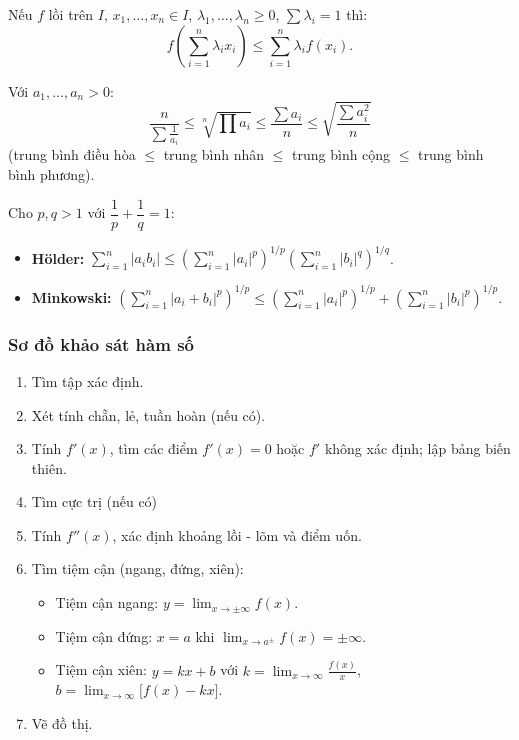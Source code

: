 \documentclass[12pt,a4paper]{article}
\begin{document}
\begin{dinhly}[title={Bất đẳng thức Jensen}]
  Nếu $f$ lồi trên $I$, $x_1, \ldots, x_n \in I$, $\lambda_1, \ldots, \lambda_n \ge 0$, $\sum \lambda_i = 1$ thì:
  \[
    f\!\left(\sum_{i=1}^{n} \lambda_i x_i\right) \le \sum_{i=1}^{n} \lambda_i f(x_i).
  \]
\end{dinhly}

\begin{dinhly}[title={Bất đẳng thức về số trung bình}]
  Với $a_1, \ldots, a_n > 0$:
  \[
    \frac{n}{\sum \frac{1}{a_i}} \le \sqrt[n]{\prod a_i} \le \frac{\sum a_i}{n} \le \sqrt{\frac{\sum a_i^2}{n}}
  \]
  (trung bình điều hòa $\le$ trung bình nhân $\le$ trung bình cộng $\le$ trung bình bình phương).
\end{dinhly}

\begin{dinhly}[title={Bất đẳng thức Hölder và Minkowski}]
  Cho $p, q > 1$ với $\dfrac{1}{p} + \dfrac{1}{q} = 1$:
  \begin{itemize}
    \item \textbf{Hölder:} $\displaystyle\sum_{i=1}^{n} |a_i b_i| \le \left(\sum_{i=1}^{n} |a_i|^p\right)^{1/p} \left(\sum_{i=1}^{n} |b_i|^q\right)^{1/q}$.
    \item \textbf{Minkowski:} $\displaystyle\left(\sum_{i=1}^{n} |a_i + b_i|^p\right)^{1/p} \le \left(\sum_{i=1}^{n} |a_i|^p\right)^{1/p} + \left(\sum_{i=1}^{n} |b_i|^p\right)^{1/p}$.
  \end{itemize}
\end{dinhly}

\subsubsection{Sơ đồ khảo sát hàm số}

\begin{phuongphap}
  \begin{enumerate}
    \item Tìm tập xác định.
    \item Xét tính chẵn, lẻ, tuần hoàn (nếu có).
    \item Tính $f'(x)$, tìm các điểm $f'(x) = 0$ hoặc $f'$ không xác định; lập bảng biến thiên.
    \item Tìm cực trị (nếu có)
    \item Tính $f''(x)$, xác định khoảng lồi - lõm và điểm uốn.
    \item Tìm tiệm cận (ngang, đứng, xiên):
      \begin{itemize}
        \item Tiệm cận ngang: $y = \displaystyle\lim_{x \to \pm\infty} f(x)$.
        \item Tiệm cận đứng: $x = a$ khi $\displaystyle\lim_{x \to a^{\pm}} f(x) = \pm\infty$.
        \item Tiệm cận xiên: $y = kx + b$ với $k = \displaystyle\lim_{x \to \infty} \frac{f(x)}{x}$, $b = \displaystyle\lim_{x \to \infty} \bigl[f(x) - kx\bigr]$.
      \end{itemize}
    \item Vẽ đồ thị.
  \end{enumerate}
\end{phuongphap}
\end{document}
